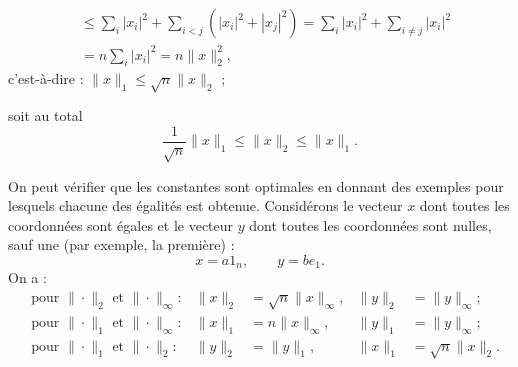 {\begin{description}
\begin{description}
\begin{align*}
      & \leq \sum_i |x_i|^2 + \sum_{i < j} (|x_i|^2 + |x_j|^2) 
      = \sum_i |x_i|^2 + \sum_{i \neq j} |x_i|^2 \\
      & = n \sum_i |x_i|^2 = n \|x\|_2^2,
    \end{align*}
    c'est-à-dire : $\|x\|_1 \leq \sqrt{n} \|x\|_2$ ;
  \end{description}
  soit au total
  $$
  \frac1{\sqrt{n}} \|x\|_1 \leq \|x\|_2 \leq \|x\|_1.
  $$
\end{description}
On peut vérifier que les constantes sont optimales en donnant des exemples pour lesquels chacune des égalités est obtenue. Considérons le vecteur $x$ dont toutes les coordonnées sont égales et le vecteur $y$ dont toutes les coordonnées sont nulles, sauf une (par exemple, la première) :
$$
x = a 1_n, \qquad y = b e_1.
$$
On a :
\begin{align*}
  & \text{pour } \|\cdot\|_2 \text{ et } \|\cdot\|_\infty : & 
  \|x\|_2 & = \sqrt{n} \|x\|_\infty, & 
  \|y\|_2 & = \|y\|_\infty; \\
  & \text{pour } \|\cdot\|_1 \text{ et } \|\cdot\|_\infty : & 
  \|x\|_1 & = n \|x\|_\infty, & 
  \|y\|_1 & = \|y\|_\infty; \\
  & \text{pour } \|\cdot\|_1 \text{ et } \|\cdot\|_2 : & 
  \|y\|_2 & = \|y\|_1, &
  \|x\|_1 & = \sqrt{n} \|x\|_2.
\end{align*}
}

